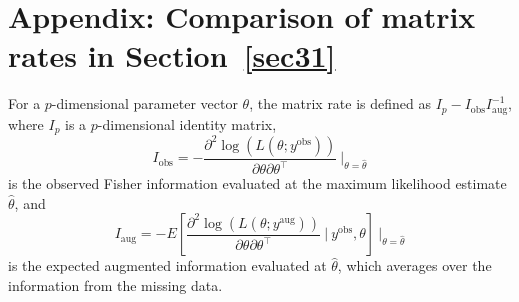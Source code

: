 \documentclass[12pt]{article}
\begin{document}
\appendix
\setcounter{secnumdepth}{0}
\section{Appendix: Comparison of matrix rates  in Section~\ref{sec31}}\label{app1}
For a $p$-dimensional parameter vector $\theta$, the matrix rate is defined as $I_p - I_{\textrm{obs}}I^{-1}_{\textrm{aug}}$, where $I_p$ is a $p$-dimensional identity matrix, 
$$
I_{\textrm{obs}}=-\frac{\partial^2 \log(L(\theta; y^{\textrm{obs}}))}{\partial \theta \partial \theta^\top}~\bigg\vert_{\theta=\hat{\theta}}
$$
is the observed Fisher information  evaluated at the maximum likelihood estimate $\hat{\theta}$, and
$$
I_{\textrm{aug}}=-E\left[\frac{\partial^2 \log(L(\theta; y^{\textrm{aug}}))}{\partial \theta \partial \theta^\top}~\bigg\vert~y^{\textrm{obs}}, \theta\right]~\bigg\vert_{\theta=\hat{\theta}}
$$
is the expected augmented information evaluated at $\hat{\theta}$, which averages over the  information from the missing data. 
\end{document}
